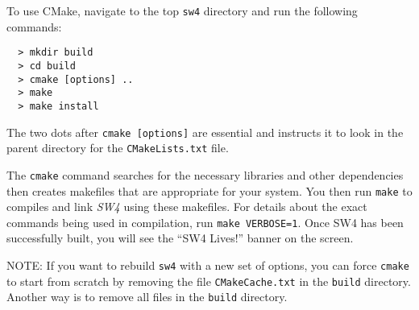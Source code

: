 \documentclass[11pt]{article}
\begin{document}
To use CMake, navigate to the top {\tt sw4} directory and run the following commands:
\begin{verbatim}
  > mkdir build
  > cd build
  > cmake [options] ..
  > make
  > make install
\end{verbatim}

The two dots after {\tt cmake [options]} are essential and instructs it to look in the parent
directory for the {\tt CMakeLists.txt} file.
 
The \verb+cmake+ command searches for the necessary libraries and other dependencies then creates
makefiles that are appropriate for your system. You then run \verb+make+ to compiles and link
\emph{SW4} using these makefiles. For details about the exact commands being used in compilation,
run \texttt{make VERBOSE=1}.  Once SW4 has been successfully built, you will see the
``SW4 Lives!'' banner on the screen.

NOTE: If you want to rebuild \verb+sw4+ with a new set of options, you can force \verb+cmake+ to start
from scratch by removing the file \verb+CMakeCache.txt+ in the \verb+build+ directory. Another way
is to remove all files in the \verb+build+ directory.
\end{document}
